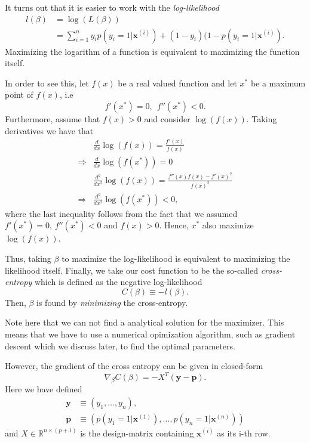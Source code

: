 \documentclass[a4paper, twocolumn]{article}
\begin{document}
It turns out that it is easier to work with the \textit{log-likelihood}
\begin{align}
 l(\beta) &= \log(L(\beta)) \nonumber \\
 &= \sum_{i=1}^n y_i p(y_i=1 | \mathbf{x}^{(i)}) + (1-y_i)( 1-p(y_i=1 | \mathbf{x}^{(i)}).
\end{align}
Maximizing the logarithm of a function is equivalent to maximizing the function itself. 

In order to see this, let $f(x)$ be a
real valued function and let $x^*$ be a maximum point of $f(x)$, i.e 
\begin{equation}
 f'(x^*) = 0, \ \ f''(x^*) < 0.
\end{equation}
Furthermore, assume that $f(x) > 0$ and consider $\log(f(x))$. Taking derivatives we have that 
\begin{align}
 &\frac{d}{dx} \log (f(x)) = \frac{f'(x)}{f(x)} \\
 \Rightarrow &\frac{d}{dx} \log(f(x^*)) = 0 \\
 &\frac{d^2}{dx^2} \log(f(x)) = \frac{f''(x) f(x) - f'(x)^2}{f(x)^2} \\
 \Rightarrow &\frac{d^2}{dx^2} \log(f(x^*)) < 0, 
\end{align}
where the last inequality follows from the fact that we assumed $f'(x^*) = 0, \, f''(x^*) < 0$ and $f(x) > 0$. Hence, $x^*$
also maximize $\log(f(x))$.

Thus, taking $\beta$ to maximize the log-likelihood is equivalent to maximizing the likelihood itself. Finally, we take our 
cost function to be the so-called \textit{cross-entropy} which is defined as the negative log-likelihood 
\begin{equation}
 C(\beta) \equiv  -l(\beta).
\end{equation}
Then, $\beta$ is found by \textit{minimizing} the cross-entropy. 

Note here that we can not find a analytical solution for the maximizer. This means that we have to use a
numerical opimization algorithm, such as gradient descent which we discuss later, to find the optimal parameters.

However, the gradient of the cross entropy can be given in closed-form 
\begin{equation}
 \nabla_\beta C(\beta) = - X^{T} \left( \mathbf{y} - \mathbf{p} \right). 
\end{equation}
Here we have defined \begin{align}
\mathbf{y} &\equiv (y_1,\dots,y_n), \\       
      \mathbf{p} &\equiv \left( p(y_1=1|\mathbf{x}^{(1)}),\dots,p(y_n=1|\mathbf{x}^{(n)}) \right)
      \end{align}
and $X \in \mathbb{R}^{n \times (p+1)}$ is the design-matrix containing $\mathbf{x}^{(i)}$ as its i-th row.
\end{document}
